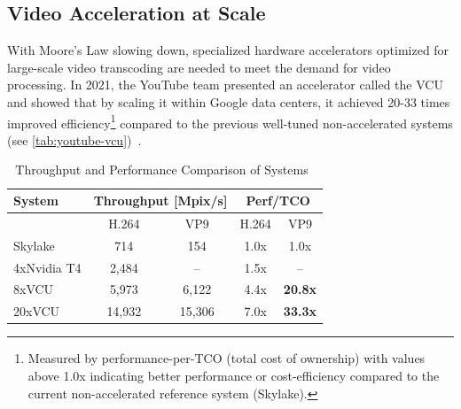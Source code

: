 \subsection{Video Acceleration at Scale}

With Moore's Law slowing down, specialized hardware accelerators optimized for large-scale video transcoding are needed to meet the demand for video processing. 
In 2021, the YouTube team presented an accelerator called the \ac{VCU} and showed that by scaling it within Google data centers, it achieved 20-33 times improved efficiency\footnote{Measured by performance-per-TCO (total cost of ownership) with values above 1.0x indicating better performance or cost-efficiency compared to the current non-accelerated reference system (Skylake).} compared to the previous well-tuned non-accelerated systems (see \autoref{tab:youtube-vcu})~\parencite{youtube_infrastructure}.

\begin{table}[h!]
\centering
\caption{Throughput and Performance Comparison of Systems~\parencite{youtube_vpu}}\label{tab:youtube-vcu}
\begin{tabular}{|l|cc|cc|}
\hline
\textbf{System}      & \multicolumn{2}{c|}{\textbf{Throughput [Mpix/s]}} & \multicolumn{2}{c|}{\textbf{Perf/TCO}}    \\ \hline
            & \multicolumn{1}{c|}{H.264}       & VP9       & \multicolumn{1}{c|}{H.264} & VP9 \\ \hline
Skylake     & \multicolumn{1}{c|}{714}            & 154           & \multicolumn{1}{c|}{1.0x}      & 1.0x     \\ \hline
4xNvidia T4 & \multicolumn{1}{c|}{2,484}          & --            & \multicolumn{1}{c|}{1.5x}      & --       \\ \hline
8xVCU       & \multicolumn{1}{c|}{5,973}          & 6,122         & \multicolumn{1}{c|}{4.4x}      & \textbf{20.8x}    \\ \hline
20xVCU      & \multicolumn{1}{c|}{14,932}         & 15,306        & \multicolumn{1}{c|}{7.0x}      & \textbf{33.3x}    \\ \hline
\end{tabular}
\end{table}

